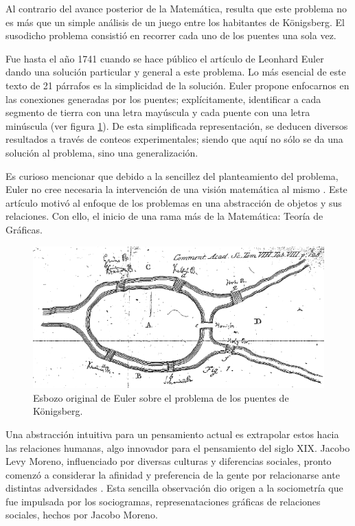 \documentclass[../main.tex]{subfiles}
\begin{document}
Al contrario del avance posterior de la Matemática, resulta que este problema no es más que un simple análisis de un juego entre los habitantes de Königsberg. El susodicho problema consistió en recorrer cada uno de los puentes una sola vez.

Fue hasta el año 1741 cuando se hace público el artículo de Leonhard Euler dando una solución particular y general a este problema. Lo más esencial de este texto de 21 párrafos es la simplicidad de la solución. Euler propone enfocarnos en las conexiones generadas por los puentes; explícitamente, identificar a cada segmento de tierra con una letra mayúscula y cada puente con una letra minúscula (ver figura \ref{fig:marcoteorico_abstracteuler}).   De esta simplificada representación, se deducen diversos resultados a través de conteos experimentales; siendo que aquí no sólo se da una solución al problema, sino una generalización.

Es curioso mencionar que debido a la sencillez del planteamiento del problema, Euler no cree necesaria la intervención de una visión matemática al mismo \cite{thetrueaboutkonigsberg}. Este artículo motivó al enfoque de los problemas en una abstracción de objetos y sus relaciones. Con ello, el inicio de una rama más de la Matemática: Teoría de Gráficas.



\begin{figure}[h!]
    \centering
    \includegraphics[scale = 0.5]{images/marcoteorico_abstract.png}
    \caption{Esbozo original de Euler sobre el problema de los puentes de Königsberg.}
    \label{fig:marcoteorico_abstracteuler}
\end{figure}



Una abstracción intuitiva para un pensamiento actual es extrapolar estos hacia las relaciones humanas, algo innovador para el pensamiento del siglo XIX. Jacobo Levy Moreno, influenciado por diversas culturas y diferencias sociales, pronto comenzó a considerar la afinidad y preferencia de la gente por relacionarse ante distintas adversidades \cite{moreno_intro}. Esta sencilla observación dio origen a la sociometría que fue impulsada por los sociogramas, represenataciones gráficas de relaciones sociales, hechos por Jacobo Moreno.
\end{document}
